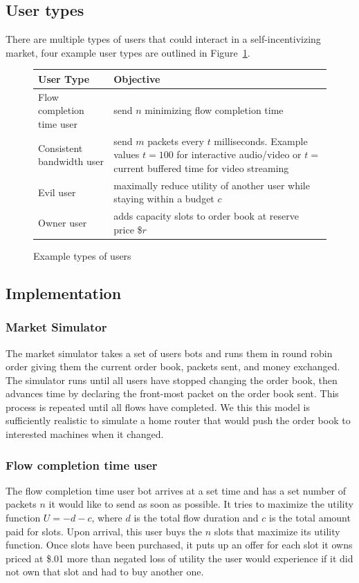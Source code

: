 \subsection{User types}
There are multiple types of users that could interact in a self-incentivizing market, four example user types are outlined in Figure~\ref{f:user_types}.
\begin{figure}
\begin{tabular}{|p{}|p{}|}
\hline
User Type & Objective \\
\hline
Flow completion time user & send $n$ minimizing flow completion time \\
\hline
Consistent bandwidth user & send $m$ packets every $t$ milliseconds. Example values $t=100$ for interactive audio/video or $t=$ current buffered time for video streaming \\
\hline
Evil user & maximally reduce utility of another user while staying within a budget $c$ \\
\hline
Owner user & adds capacity slots to order book at reserve price \$$r$\\
\hline
\end{tabular}
\caption{Example types of users}
\label{f:user_types}
\end{figure}

\subsection{Implementation}
\subsubsection{Market Simulator}
The market simulator takes a set of users bots and runs them in round robin order giving them the current order book, packets sent, and money exchanged. The simulator runs until all users have stopped changing the order book, then advances time by declaring the front-most packet on the order book sent. This process is repeated until all flows have completed. We this this model is sufficiently realistic to simulate a home router that would push the order book to interested machines when it changed.

\subsubsection{Flow completion time user}
The flow completion time user bot arrives at a set time and has a set number of packets $n$ it would like to send as soon as possible. It tries to maximize the utility function $U= -d - c$, where $d$ is the total flow duration and $c$ is the total amount paid for slots.
Upon arrival, this user buys the $n$ slots that maximize its utility function. Once slots have been purchased, it puts up an offer for each slot it owns priced at \$.01 more than negated loss of utility the user would experience if it did not own that slot and had to buy another one.

